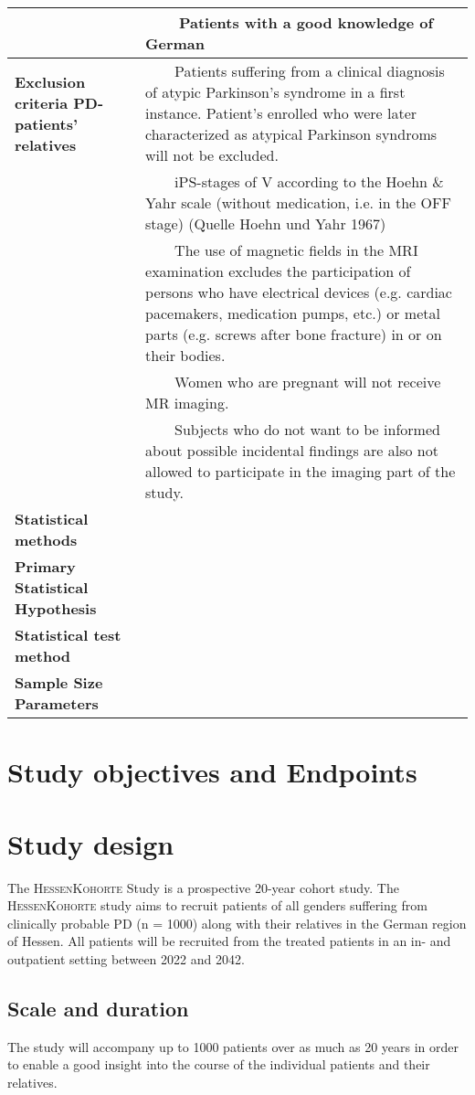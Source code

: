 \documentclass[
	a4paper, 
	11.5pt,
	headings=small, 
	twoside, 
	titlepage=firstiscover, 
 	pagesize=auto,
  	version=last,
	open=any,
	BCOR=14mm,
  	chapterprefix=false]{scrbook}
\newcommand{\tabitem}{~~\llap{\textbullet}~~}
\begin{document}
\begin{tabularx}{1\textwidth}{m{3.5cm} | X}
							& \tabitem{Patients with a good knowledge of German} \\
\midrule
\textbf{Exclusion criteria \ac{PD}-patients' relatives}& \tabitem{Patients suffering from a clinical diagnosis of atypic Parkinson's syndrome in a first instance. Patient's enrolled who were later characterized as atypical Parkinson syndroms will not be excluded.}\\
							& \tabitem{\ac{iPS}-stages of V according to the Hoehn \& Yahr scale (without medication, i.e. in the OFF stage) (Quelle Hoehn und Yahr 1967)}\\
							& \tabitem{The use of magnetic fields in the MRI examination excludes the participation of persons who have electrical devices (e.g. cardiac pacemakers, medication pumps, etc.) or metal parts (e.g. screws after bone fracture) in or on their bodies.}\\
							& \tabitem{Women who are pregnant will not receive MR imaging.}\\
							& \tabitem{Subjects who do not want to be informed about possible incidental findings are also not allowed to participate in the imaging part of the study.}\\
\midrule


\textbf{Statistical methods} 		& \\
\textbf{Primary Statistical Hypothesis}& \\
\textbf{Statistical test method} 		& \\
\textbf{Sample Size Parameters} 		& \\
\bottomrule
\end{tabularx}
\newpage



\section{Study objectives and Endpoints}
\section{Study design}
The \textsc{HessenKohorte} Study is a prospective 20-year cohort study. The \textsc{HessenKohorte} study aims to recruit patients of all genders suffering from clinically probable \ac{PD} (n = 1000) along with their relatives in the German region of Hessen. All patients will be recruited from the treated patients in an in- and outpatient setting between 2022 and 2042. 

\subsection{Scale and duration}
The study will accompany up to 1000 patients over as much as 20 years in order to enable a good insight into the course of the individual patients and their relatives.
\end{document}
